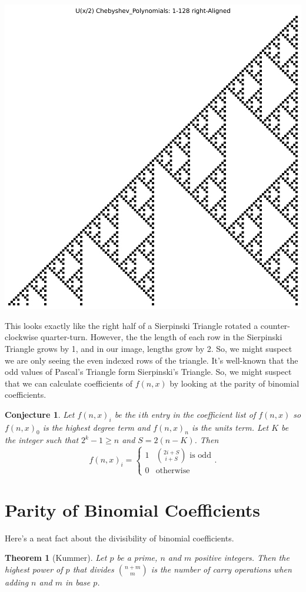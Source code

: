\documentclass{article}
\newtheorem{theorem}{Theorem}
\newtheorem{conjecture}{Conjecture}
\begin{document}
	\begin{center}
		\includegraphics[width=.8\textwidth]{../../code/serialization/chebyshev/chebyshev1_right_128.png}	
	\end{center}

	This looks exactly like the right half of a Sierpinski Triangle rotated a counter-clockwise quarter-turn.
	However, the the length of each row in the Sierpinski Triangle grows by 1, and in our image, lengths grow by 2.
	So, we might suspect we are only seeing the even indexed rows of the triangle.
	It's well-known that the odd values of Pascal's Triangle form Sierpinski's Triangle.
	So, we might suspect that we can calculate coefficients of $f(n,x)$ by looking at the parity of binomial coefficients.
	
	\begin{conjecture}
		Let $f(n,x)_i$ be the $i$th entry in the coefficient list of $f(n,x)$ so $f(n,x)_0$ is the highest degree term and $f(n,x)_n$ is the units term.
		Let $K$ be the integer such that $2^k - 1 \geq n$ and $S = 2(n-K)$.
		Then
		\begin{equation*}
			f(n,x)_i = \begin{cases}
				1 & \binom{2i + S}{i + S} \text{ is odd} \\
				0 & \text{otherwise}
			\end{cases}.
		\end{equation*}
	\end{conjecture}

	\section{Parity of Binomial Coefficients}
	Here's a neat fact about the divisibility of binomial coefficients.
	\begin{theorem}[Kummer]
		Let $p$ be a prime, $n$ and $m$ positive integers.
		Then the highest power of $p$ that divides $\binom{n+m}{m}$ is the number of carry operations when adding $n$ and $m$ in base $p$.
	\end{theorem}
\end{document}
